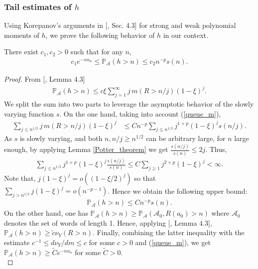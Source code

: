 \documentclass{ws-sd}
\newcommand{\Proba}{\mathbb{P}}
\renewcommand{\Tilde}{\widetilde}
\begin{document}
\subsubsection{Tail estimates of \texorpdfstring{$h$}{}}
Using Korepanov's arguments in [, Sec. 4.3] for strong and weak polynomial moments of $h$, we prove the following behavior of $h$ in our context.
\begin{proposition}\label{queue_h}
    There exist $c_1, c_2 >0$ such that for any $n$,
    \begin{align}\label{ineq_queue_h}
        c_1 e^{-nu_n} \le \Proba_{\mathcal{A}}(h > n) \le c_2 n^{-p}s(n)
        .
    \end{align}
\end{proposition}
\begin{proof}
     From [, Lemma 4.3]
    \begin{align*}
        \Proba_{\mathcal{A}}(h > n)
        \le c\xi\sum_{j=1}^{\infty} j \, m(R>n/j)(1-\xi)^j
        .
    \end{align*}
    We split the sum into two parts to leverage the asymptotic behavior of the slowly varying function $s$.
    On the one hand, taking into account (\ref{queue_m}),
    \begin{align*}
        \sum_{j \le n^{1/2}} j \, m(R>n/j)(1-\xi)^j
        &\le Cn^{-p} \sum_{j \le n^{1/2}} j^{1+p}(1-\xi)^j s(n/j).
    \end{align*}
    As $s$ is slowly varying, and both $n,n/j \ge n^{1/2}$ can be arbitrary large, for $n$ large enough, by applying Lemma \ref{Potter_theorem} we get
    $\frac{s(n/j)}{s(n)} \le 2j$.
    Thus,
    \begin{align*}
        \sum_{j \le n^{1/2}} j^{1+p}(1-\xi)^j \frac{s(n/j)}{s(n)}
        \le
        C\sum_{j \ge 1} j^{2+p} (1-\xi)^j
        < \infty.
    \end{align*}
    Note that, $ j(1-\xi)^j = o((1-\xi/2)^j) $ so that $\sum_{j > n^{1/2}} j(1-\xi)^j = o(n^{-p-1})$.
    Hence we obtain the following upper bound:
    \begin{align*}
        \Proba_{\mathcal{A}}(h > n) \le Cn^{-p}s(n).
    \end{align*}
   On the other hand, one has
    $
       \Proba_{\mathcal{A}}(h > n) \ge \Proba_{\mathcal{A}}(\mathcal A_0, R(a_0) > n)
    $
    where $\mathcal A_0$ denotes the set of words of length 1.
    Hence, applying [, Lemma 4.3],
   $
        \Proba_{\mathcal{A}}(h > n) \ge \tilde c\nu_Y(R > n).
    $
    Finally, combining the latter inequality with the estimate $c^{-1} \le d\nu_Y/dm \le c$ for some $c > 0$ and  (\ref{queue_m}), we get $ \Proba_{\mathcal{A}}(h > n) \ge \Tilde Ce^{-nu_n}$ for some $\Tilde C > 0$.
    \\
\end{proof}
\end{document}
